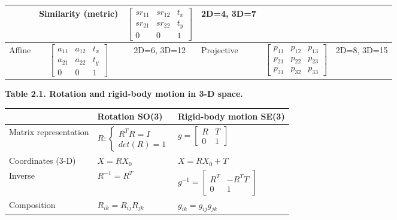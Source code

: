 \documentclass{../cheat}
\begin{document}
\begin{tables}
\begin{multicols}{2}
\begin{tabularx}{\columnwidth}{| @{ }p{40pt} | c
				 | @{ }c  || @{ }p{35pt} | >{\centering\arraybackslash}X | @{ }c |}
	& Similarity (metric)
	& $\begin{bmatrix}
		s r_{11} & s r_{12}  & t_x\\ s r_{21} & s r_{22} & t_y\\0 & 0 & 1\end{bmatrix}$
	& 2D=4, \newline 3D=7 \\ \hline %
	
	Affine
	& $\begin{bmatrix}
		a_{11} & a_{12} & t_x\\ a_{21} & a_{22} & t_y\\0 & 0 & 1\end{bmatrix}$	
	&  2D=6, \newline 3D=12 %

	& Projective
	& $\begin{bmatrix}p_{11} & p_{12} & p_{13}\\
		 p_{21} & p_{22} & p_{23}\\ p_{31} & p_{32} & p_{33}\end{bmatrix}$
	& 2D=8, \newline 3D=15 \\ \hline %
	\end{tabularx}

	\textbf{Table 2.1. Rotation and rigid-body motion in 3-D space.}\\
	\begin{tabularx}{\columnwidth}{| l | X | X |}
	\hline
	& Rotation SO(3) & Rigid-body motion SE(3) \\ \hline \hline
	Matrix representation &  $R: \left\{ \begin{array}{l}
		R^T R=I\\ det(R)=1	\end{array}\right.$ & $g=\begin{bmatrix}
		R & T\\0 & 1 	\end{bmatrix}$\\ \hline
	Coordinates (3-D) & $X=RX_0$ & $X=RX_0+T$\\ \hline
	Inverse & $R^{-1}=R^T$ & $g^{-1} = \begin{bmatrix}
		R^T & -R^T T\\ 0 & 1 \end{bmatrix}$\\ \hline
	Composition & $R_{ik} = R_{ij} R_{jk}$ & $g_{ik} = g_{ij} g_{jk}$\\ \hline \hline
	

\end{tabularx}
\end{multicols}
\end{tables}
\end{document}
